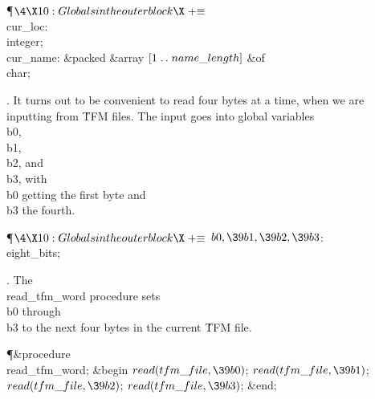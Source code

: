 \Y\P$\4\X10:Globals in the outer block\X\mathrel{+}\S$\6
\4\\{cur\_loc}: \\{integer};%
\6
\4\\{cur\_name}: \&{packed} \&{array} $[1\to\\{name\_length}]$ \1\&{of}\5
\\{char};\2\par
\fi

. It turns out to be convenient to read four bytes at a time, when we are
inputting from \.{TFM} files. The input goes into global variables
\\{b0}, \\{b1}, \\{b2}, and \\{b3}, with \\{b0} getting the first byte and %
\\{b3}
the fourth.

\Y\P$\4\X10:Globals in the outer block\X\mathrel{+}\S$\6
\4$\\{b0},\39\\{b1},\39\\{b2},\39\\{b3}$: \\{eight\_bits};\par
\fi

. The \\{read\_tfm\_word} procedure sets \\{b0} through \\{b3} to the next
four bytes in the current \.{TFM} file.

\Y\P\4\&{procedure}\1\  \\{read\_tfm\_word};\2\6
\&{begin} $\\{read}(\\{tfm\_file},\39\\{b0})$;\5
$\\{read}(\\{tfm\_file},\39\\{b1})$;\5
$\\{read}(\\{tfm\_file},\39\\{b2})$;\5
$\\{read}(\\{tfm\_file},\39\\{b3})$;\6
\&{end};\par
\fi

